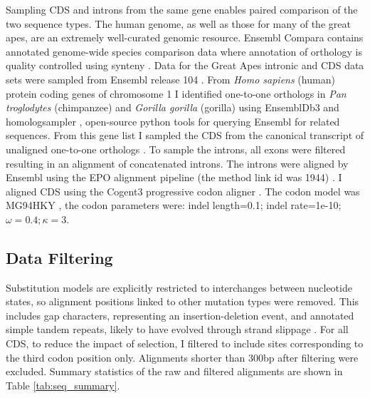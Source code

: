 Sampling CDS and introns from the same gene enables paired comparison of the two sequence types. The human genome, as well as those for many of the great apes, are an extremely well-curated genomic resource. Ensembl Compara contains annotated genome-wide species comparison data where annotation of orthology is quality controlled using synteny \citep{Herrero2016EnsemblResources}. Data for the Great Apes intronic and CDS data sets were sampled from Ensembl release 104 \citep{Howe2021Ensembl2021}. From \textit{Homo sapiens} (human) protein coding genes of chromosome 1 I identified one-to-one orthologs in \textit{Pan troglodytes} (chimpanzee) and \textit{Gorilla gorilla} (gorilla) using EnsemblDb3 \citep{HuttleyEnsembldb3} and homologsampler \citep{HuttleyHomologsampler}, open-source python tools for querying Ensembl for related sequences. From this gene list I sampled the CDS from the canonical transcript of unaligned one-to-one orthologs \cite{Howe2021Ensembl2021}. To sample the introns, all exons were filtered resulting in an alignment of concatenated introns. The introns were aligned by Ensembl using the EPO alignment pipeline (the method link id was 1944) \citep{Howe2021Ensembl2021}. I aligned CDS using the Cogent3 progressive codon aligner \citep{Knight2007PyCogent:Sequence}. The codon model was MG94HKY \citep{Muse1994AGenome}, the codon parameters were: indel length=0.1; indel rate=1e-10; $\omega=0.4; \kappa=3$. 

\subsection{Data Filtering}
\label{Data Filtering}

Substitution models are explicitly restricted to interchanges between nucleotide states, so alignment positions linked to other mutation types were removed. This includes gap characters, representing an insertion-deletion event, and annotated simple tandem repeats, likely to have evolved through strand slippage \citep{Levinson1987Slipped-strandEvolution}. For all CDS, to reduce the impact of selection, I filtered to include sites corresponding to the third codon position only. Alignments shorter than $300$bp after filtering were excluded. Summary statistics of the raw and filtered alignments are shown in Table \ref{tab:seq_summary}. 



